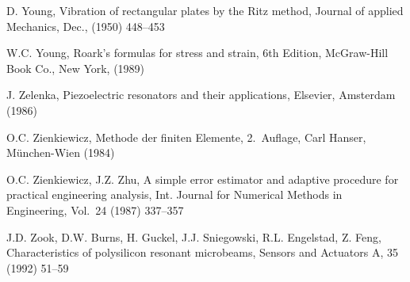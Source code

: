 \begin{thebibliography}{xxx}
 D. Young, Vibration of rectangular plates by the Ritz method, Journal of
 applied Mechanics, Dec., (1950) 448--453

 W.C. Young, Roark's formulas for stress and strain, 6th Edition, McGraw-Hill
 Book Co., New York, (1989)

 J. Zelenka, Piezoelectric resonators and their applications, Elsevier,
 Amsterdam (1986)

 O.C. Zienkiewicz, Methode der finiten Elemente, 2.~Auflage, Carl Hanser,
 München-Wien (1984)

 O.C. Zienkiewicz, J.Z. Zhu, A simple error estimator and adaptive procedure
 for practical engineering analysis, Int. Journal for Numerical Methods in
 Engineering, Vol.~24 (1987) 337--357

 J.D. Zook, D.W. Burns, H. Guckel, J.J. Sniegowski, R.L. Engelstad, Z. Feng,
 Characteristics of polysilicon resonant microbeams, Sensors and Actuators A,
 35 (1992) 51--59

\end{thebibliography}

